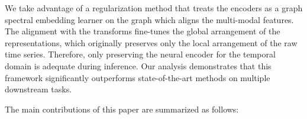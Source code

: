 \documentclass{article}
\begin{document}

We take advantage of a regularization method that treats the encoders as a graph spectral embedding learner on the graph which aligns the multi-modal features. The alignment with the transforms fine-tunes the global arrangement of the representations, which originally preserves only the local arrangement of the raw time series.
Therefore, only preserving the neural encoder for the temporal domain is adequate during inference. Our analysis demonstrates that this framework significantly outperforms state-of-the-art methods on multiple downstream tasks.





The main contributions of this paper are summarized as follows:
\end{document}
